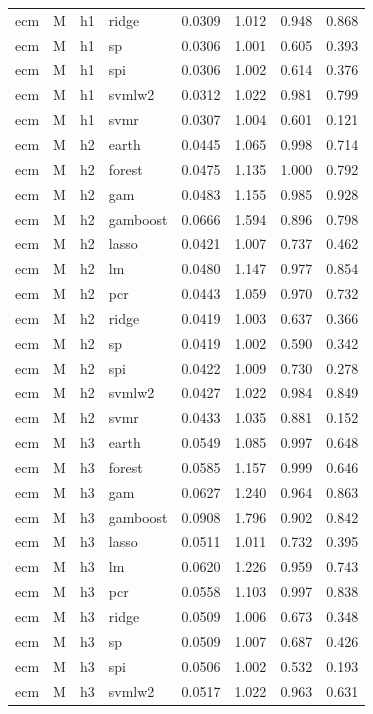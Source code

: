 \begin{ThreePartTable}
\begin{longtable}[t]{llclcccc}
ecm & M & h1 & ridge & 0.0309 & 1.012 & 0.948 & 0.868\\
ecm & M & h1 & sp & 0.0306 & 1.001 & 0.605 & 0.393\\
ecm & M & h1 & spi & 0.0306 & 1.002 & 0.614 & 0.376\\
ecm & M & h1 & svmlw2 & 0.0312 & 1.022 & 0.981 & 0.799\\
ecm & M & h1 & svmr & 0.0307 & 1.004 & 0.601 & 0.121\\
\addlinespace
ecm & M & h2 & earth & 0.0445 & 1.065 & 0.998 & 0.714\\
ecm & M & h2 & forest & 0.0475 & 1.135 & 1.000 & 0.792\\
ecm & M & h2 & gam & 0.0483 & 1.155 & 0.985 & 0.928\\
ecm & M & h2 & gamboost & 0.0666 & 1.594 & 0.896 & 0.798\\
ecm & M & h2 & lasso & 0.0421 & 1.007 & 0.737 & 0.462\\
ecm & M & h2 & lm & 0.0480 & 1.147 & 0.977 & 0.854\\
ecm & M & h2 & pcr & 0.0443 & 1.059 & 0.970 & 0.732\\
ecm & M & h2 & ridge & 0.0419 & 1.003 & 0.637 & 0.366\\
ecm & M & h2 & sp & 0.0419 & 1.002 & 0.590 & 0.342\\
ecm & M & h2 & spi & 0.0422 & 1.009 & 0.730 & 0.278\\
ecm & M & h2 & svmlw2 & 0.0427 & 1.022 & 0.984 & 0.849\\
ecm & M & h2 & svmr & 0.0433 & 1.035 & 0.881 & 0.152\\
\addlinespace
ecm & M & h3 & earth & 0.0549 & 1.085 & 0.997 & 0.648\\
ecm & M & h3 & forest & 0.0585 & 1.157 & 0.999 & 0.646\\
ecm & M & h3 & gam & 0.0627 & 1.240 & 0.964 & 0.863\\
ecm & M & h3 & gamboost & 0.0908 & 1.796 & 0.902 & 0.842\\
ecm & M & h3 & lasso & 0.0511 & 1.011 & 0.732 & 0.395\\
ecm & M & h3 & lm & 0.0620 & 1.226 & 0.959 & 0.743\\
ecm & M & h3 & pcr & 0.0558 & 1.103 & 0.997 & 0.838\\
ecm & M & h3 & ridge & 0.0509 & 1.006 & 0.673 & 0.348\\
ecm & M & h3 & sp & 0.0509 & 1.007 & 0.687 & 0.426\\
ecm & M & h3 & spi & 0.0506 & 1.002 & 0.532 & 0.193\\
ecm & M & h3 & svmlw2 & 0.0517 & 1.022 & 0.963 & 0.631\\

\end{longtable}
\end{ThreePartTable}

